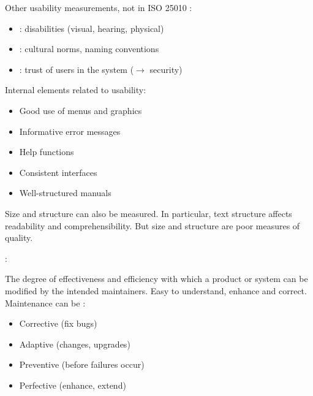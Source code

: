 Other usability measurements, not in ISO 25010 :
\begin{itemize}
    \item {} : disabilities (visual, hearing, physical)
    \item {} : cultural norms, naming conventions
    \item {} : trust of users in the system ($\rightarrow$ security)
\end{itemize}

Internal elements related to usability:
\begin{itemize}
    \item Good use of menus and graphics
    \item Informative error messages
    \item Help functions
    \item Consistent interfaces
    \item Well-structured manuals
\end{itemize}

Size and structure can also be measured. In particular, text structure affects readability and comprehensibility. But size and structure are poor measures of quality.

 :

The degree of effectiveness and efficiency with which a product or system can be modified by the intended maintainers. Easy to understand, enhance and correct. Maintenance can be :
\begin{itemize}
    \item Corrective (fix bugs)
    \item Adaptive (changes, upgrades)
    \item Preventive (before failures occur)
    \item Perfective (enhance, extend)
\end{itemize}

